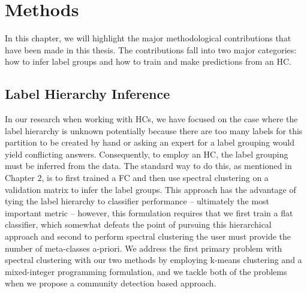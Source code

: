 \documentclass[../thesis.tex]{subfiles}
\begin{document}
\chapter{Methods}
In this chapter, we will highlight the major methodological contributions that have been made in this thesis. The contributions fall into two major categories: how to infer label groups and how to train and make predictions from an HC. 

\section{Label Hierarchy Inference}
In our research when working with HCs, we have focused on the case where the label hierarchy is unknown potentially because there are too many labels for this partition to be created by hand or asking an expert for a label grouping would yield conflicting answers. Consequently, to employ an HC, the label grouping must be inferred from the data. The standard way to do this, as mentioned in Chapter 2, is to first trained a FC and then use spectral clustering on a validation matrix to infer the label groups. This approach has the advantage of tying the label hierarchy to classifier performance -- ultimately the most important metric -- however, this formulation requires that we first train a flat classifier, which somewhat defeats the point of pursuing this hierarchical approach and second to perform spectral clustering the user must provide the number of meta-classes a-priori. We address the first primary problem with spectral clustering with our two methods by employing k-means clustering and a mixed-integer programming formulation, and we tackle both of the problems when we propose a community detection based approach.
\end{document}
